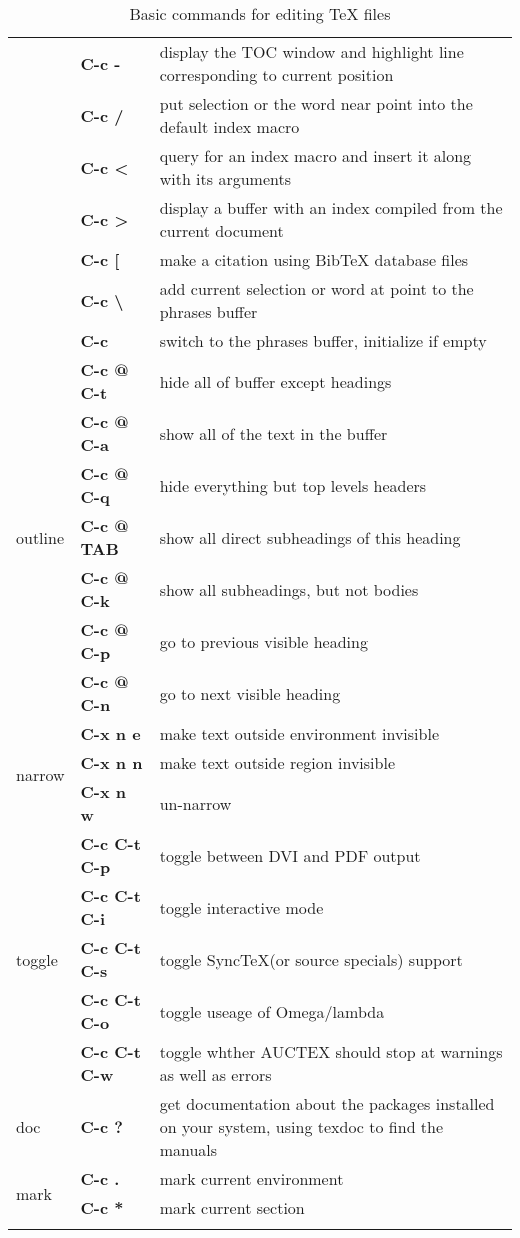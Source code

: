 \begin{center}
\begin{longtable}[H]{l>{\bfseries}lp{}}
                 & C-c - & display the TOC window and highlight line corresponding to current position\\
                 & C-c / & put selection or the word near point into the default index macro\\
                 & C-c < & query for an index macro and insert it along with its arguments\\
                 & C-c > & display a buffer with an index compiled from the current document\\
                 & C-c [ & make a citation using BibTeX database files\\
                 & C-c \textbackslash{} & add current selection or word at point to the phrases buffer\\
                 & C-c \textbar{} & switch to the phrases buffer, initialize if empty\\
    \midrule
    \multirow{7}{*}{outline} & C-c @ C-t & hide all of buffer except headings\\
                 & C-c @ C-a & show all of the text in the buffer\\
                 & C-c @ C-q & hide everything but top levels headers\\
                 & C-c @ TAB & show all direct subheadings of this heading\\
                 & C-c @ C-k & show all subheadings, but not bodies\\
                 & C-c @ C-p & go to previous visible heading\\
                 & C-c @ C-n & go to next visible heading\\
    \midrule
    \multirow{3}{*}{narrow} & C-x n e & make text outside environment invisible\\
                 & C-x n n & make text outside region invisible\\
                 & C-x n w & un-narrow\\
    \midrule
    \multirow{5}{*}{toggle} & C-c C-t C-p & toggle between DVI and PDF output\\
                 & C-c C-t C-i & toggle interactive mode\\
                 & C-c C-t C-s & toggle Sync\TeX(or source specials) support\\
                 & C-c C-t C-o & toggle useage of Omega/lambda\\
                 & C-c C-t C-w & toggle whther AUCTEX should stop at warnings as well as errors\\

    doc & C-c ? & get documentation about the packages installed on your system, using texdoc to find the manuals\\
    \midrule
    \multirow{2}{*}{mark} & C-c . & mark current environment\\
                 & C-c * & mark current section\\
    \bottomrule
    \caption{Basic commands for editing \TeX\xspace{} files}
    \label{tab:basic-commands}
  \end{longtable}
\end{center}


